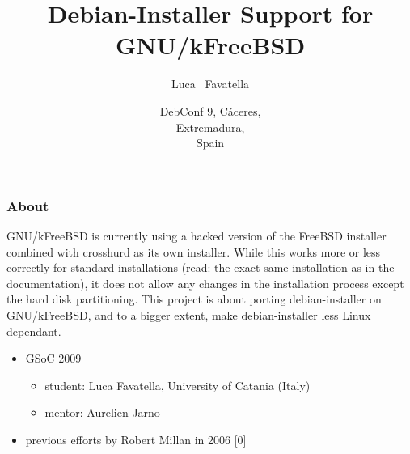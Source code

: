 \documentclass{beamer}
\title
{Debian-Installer Support for GNU/kFreeBSD}
\author
{Luca ~Favatella}
\date[Debconf 9] %
{DebConf 9, Cáceres,\\ Extremadura,\\ Spain}
\begin{document}
\begin{frame}
  \titlepage
\end{frame}



\begin{frame}
  \frametitle{About}

  GNU/kFreeBSD is currently using a hacked version of the FreeBSD installer combined with crosshurd as its own installer. While this works more or less correctly for standard installations (read: the exact same installation as in the documentation), it does not allow any changes in the installation process except the hard disk partitioning. This project is about porting debian-installer on GNU/kFreeBSD, and to a bigger extent, make debian-installer less Linux dependant.

  \begin{itemize}
  \item
    GSoC 2009
    \begin{itemize}
    \item
      student: Luca Favatella, University of Catania (Italy)
    \item
      mentor: Aurelien Jarno 
    \end{itemize}
  \item
    previous efforts by Robert Millan in 2006 [0]
  \end{itemize}

\end{frame}
\end{document}
